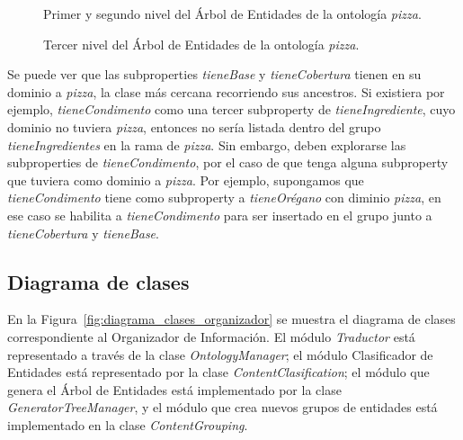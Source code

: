\begin{figure}
\centering
\begin{minipage}[c]{0.7\textwidth}
{\footnotesize 
{}}
\caption{Primer y segundo nivel del Árbol de Entidades de la ontología \emph{pizza}.}
\label{fig:macro_planning_pizza}
\end{minipage}
\end{figure}

\begin{figure}
\centering
\begin{minipage}[c]{0.7\textwidth}
{\footnotesize 
{}}
\caption{Tercer nivel del Árbol de Entidades de la ontología \emph{pizza}.}
\label{fig:macro_planning_pizza_n2}
\end{minipage}
\end{figure}


Se puede ver que las subproperties \emph{tieneBase} y \emph{tieneCobertura} tienen en su dominio a \emph{pizza}, la clase más cercana recorriendo sus ancestros. Si existiera por ejemplo, \emph{tieneCondimento} como una tercer subproperty de \emph{tieneIngrediente}, cuyo dominio no tuviera \emph{pizza}, entonces no sería listada dentro del grupo \emph{tieneIngredientes} en la rama de \emph{pizza}. Sin embargo, deben explorarse las subproperties de \emph{tieneCondimento}, por el caso de que tenga alguna subproperty que tuviera como dominio a \emph{pizza}. Por ejemplo, supongamos que \emph{tieneCondimento} tiene como subproperty a \emph{tieneOrégano} con diminio \emph{pizza}, en ese caso se habilita a \emph{tieneCondimento} para ser insertado en el grupo junto a  \emph{tieneCobertura} y \emph{tieneBase}. 

\subsection{Diagrama de clases}
En la Figura~\ref{fig:diagrama_clases_organizador} se muestra el diagrama de clases correspondiente al Organizador de Información. El módulo \emph{Traductor} está representado a través de la clase \emph{OntologyManager}; el módulo Clasificador de Entidades está representado por la clase \emph{ContentClasification}; el módulo que genera el Árbol de Entidades está implementado por la clase \emph{GeneratorTreeManager}, y el módulo que crea nuevos grupos de entidades está implementado en la clase \emph{ContentGrouping}. 

